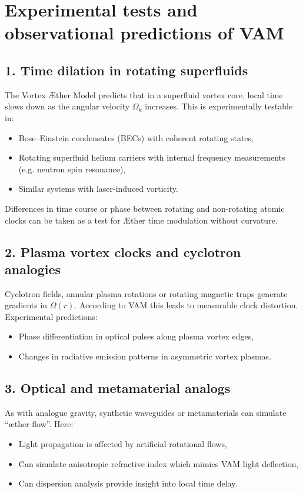 \section{Experimental tests and observational predictions of VAM}

\subsection{1. Time dilation in rotating superfluids}

The Vortex Æther Model predicts that in a superfluid vortex core, local time slows down as the angular velocity $\Omega_k$ increases. This is experimentally testable in:
\begin{itemize}
    \item Bose–Einstein condensates (BECs) with coherent rotating states,
    \item Rotating superfluid helium carriers with internal frequency measurements (e.g. neutron spin resonance),
    \item Similar systems with laser-induced vorticity.
\end{itemize}

Differences in time course or phase between rotating and non-rotating atomic clocks can be taken as a test for Æther time modulation without curvature.~\cite{Steinhauer2016}

\subsection{2. Plasma vortex clocks and cyclotron analogies}

Cyclotron fields, annular plasma rotations or rotating magnetic traps generate gradients in $\Omega(r)$. According to VAM this leads to measurable clock distortion. Experimental predictions:
\begin{itemize}
    \item Phase differentiation in optical pulses along plasma vortex edges,~\cite{Unruh1981}
    \item Changes in radiative emission patterns in asymmetric vortex plasmas.
\end{itemize}

\subsection{3. Optical and metamaterial analogs}

As with analogue gravity, synthetic waveguides or metamaterials can simulate “æther flow”. Here:
\begin{itemize}
    \item Light propagation is affected by artificial rotational flows,
    \item Can simulate anisotropic refractive index which mimics VAM light deflection,
    \item Can dispersion analysis provide insight into local time delay.
\end{itemize}


